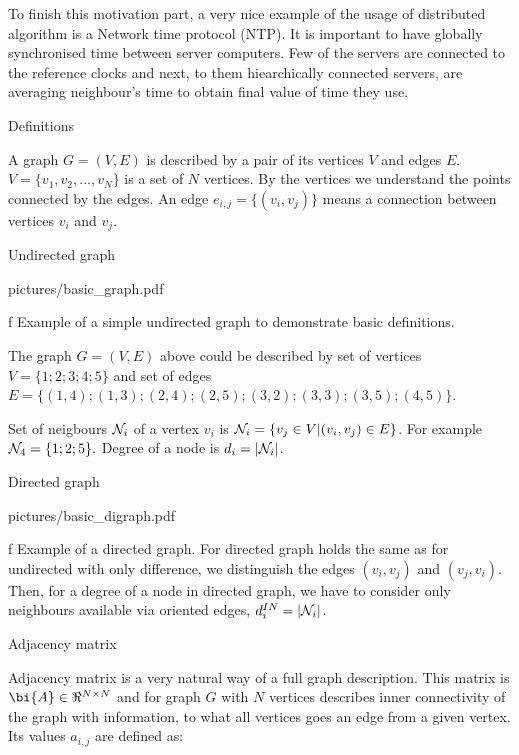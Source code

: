 To finish this motivation part, a very nice example of the usage of distributed algorithm is a Network time protocol (NTP). It is important to have globally synchronised time between server computers. Few of the servers are connected to the reference clocks and next, to them hiearchically connected servers, are averaging neighbour's time to obtain final value of time they use.


\sec Definitions

A graph $G=(V, E)$ is described by a pair of its vertices $V$ and edges $E$. ${V=\{ v_1, v_2, ..., v_N \}}$ is a set of $N$ vertices. By the vertices we understand the points connected by the edges. 
An edge $e_{i,j}= \{ \left( v_i, v_j \right)\} $ means a connection between vertices $v_i$ and $v_j$.

\secc Undirected graph

\midinsert
\picw=5cm \cinspic pictures/basic_graph.pdf
\caption/f Example of a simple undirected graph to demonstrate basic definitions. 
\endinsert

The graph $G=(V, E)$ above could be described by set of vertices ${V=\{ 1; 2; 3; 4; 5\}}$ and set of edges  $E=\{ (1, 4); (1, 3); (2, 4); (2,5); (3, 2); (3, 3); (3, 5); (4, 5) \}$.

Set of neigbours $ {\cal{N}}_i $ of a vertex $v_i$ is $ {\cal{N}}_i = \{ v_j \in V | (v_i , v_j)\in E \} $. For example $ {\cal{N}}_4 = \{1; 2; 5 \} .$ Degree of a node is  $d_i= |{\cal{N}}_i |$.

\secc Directed graph

\midinsert
\picw=5cm \cinspic pictures/basic_digraph.pdf
\caption/f Example of a directed graph. 
\endinsert
For directed graph holds the same as for undirected with only difference, we distinguish the edges 
$ ( v_i, v_j ) $ and $ ( v_j, v_i ) . $ Then, for a degree of a node in directed graph, we have to consider only neighbours available via oriented edges,  $d_i^{IN}= |{\cal{N}}_i |$.




\secc Adjacency matrix 

Adjacency matrix is a very natural way of a full graph description. This matrix is ${\bi{A}} \in \Re^{N\times{N}}$ and for graph $G$ with $N$ vertices describes inner connectivity of the graph with information, to what all vertices goes an edge from a given vertex.  Its values $a_{i,j}$ are defined as: 



